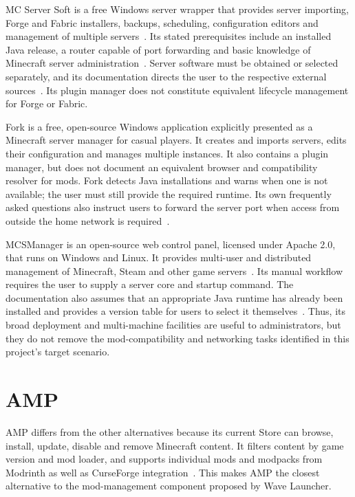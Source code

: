 MC Server Soft is a free Windows server wrapper that provides server importing, Forge and Fabric installers, backups, scheduling, configuration editors and management of multiple servers~\cite{MCSSFeatures}. Its stated prerequisites include an installed Java release, a router capable of port forwarding and basic knowledge of Minecraft server administration~\cite{MCSSDocs}. Server software must be obtained or selected separately, and its documentation directs the user to the respective external sources~\cite{MCSSServerFiles}. Its plugin manager does not constitute equivalent lifecycle management for Forge or Fabric.

Fork is a free, open-source Windows application explicitly presented as a Minecraft server manager for casual players. It creates and imports servers, edits their configuration and manages multiple instances. It also contains a plugin manager, but does not document an equivalent browser and compatibility resolver for mods. Fork detects Java installations and warns when one is not available; the user must still provide the required runtime. Its own frequently asked questions also instruct users to forward the server port when access from outside the home network is required~\cite{ForkWebsite}.

MCSManager is an open-source web control panel, licensed under Apache 2.0, that runs on Windows and Linux. It provides multi-user and distributed management of Minecraft, Steam and other game servers~\cite{MCSManagerProject}. Its manual workflow requires the user to supply a server core and startup command. The documentation also assumes that an appropriate Java runtime has already been installed and provides a version table for users to select it themselves~\cite{MCSManagerJava, MCSManagerSetup}. Thus, its broad deployment and multi-machine facilities are useful to administrators, but they do not remove the mod-compatibility and networking tasks identified in this project's target scenario.

\section{AMP}

AMP differs from the other alternatives because its current Store can browse, install, update, disable and remove Minecraft content. It filters content by game version and mod loader, and supports individual mods and modpacks from Modrinth as well as CurseForge integration~\cite{AMPMods}. This makes AMP the closest alternative to the mod-management component proposed by Wave Launcher.

